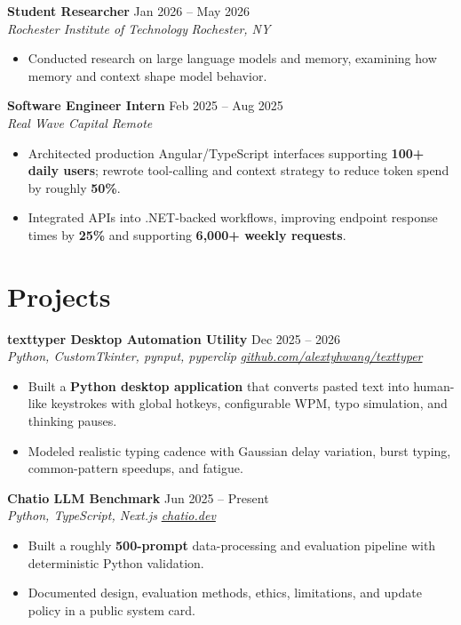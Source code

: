 \documentclass[10pt,letterpaper]{article}
\newif\ifresumeFirstRole
\newcommand{\resumeRole}[4]{%
  \ifresumeFirstRole
    \global\resumeFirstRolefalse
  \else
    \vspace{0pt plus 1fill}%
  \fi
  \textbf{#1} \hfill #2\\
  \textit{#3} \hfill \textit{#4}
}
\begin{document}
\resumeRole{Student Researcher}{Jan 2026 -- May 2026}{Rochester Institute of Technology}{Rochester, NY}
\begin{itemize}
  \item Conducted research on large language models and memory, examining how memory and context shape model behavior.
\end{itemize}

\resumeRole{Software Engineer Intern}{Feb 2025 -- Aug 2025}{Real Wave Capital}{Remote}
\begin{itemize}
  \item Architected production Angular/TypeScript interfaces supporting \textbf{100+ daily users}; rewrote tool-calling and context strategy to reduce token spend by roughly \textbf{50\%}.
  \item Integrated APIs into .NET-backed workflows, improving endpoint response times by \textbf{25\%} and supporting \textbf{6,000+ weekly requests}.
\end{itemize}

\section*{Projects}
\resumeRole{texttyper Desktop Automation Utility}{Dec 2025 -- 2026}{Python, CustomTkinter, pynput, pyperclip}{\href{https://github.com/alextyhwang/texttyper}{github.com/alextyhwang/texttyper}}
\begin{itemize}
  \item Built a \textbf{Python desktop application} that converts pasted text into human-like keystrokes with global hotkeys, configurable WPM, typo simulation, and thinking pauses.
  \item Modeled realistic typing cadence with Gaussian delay variation, burst typing, common-pattern speedups, and fatigue.
\end{itemize}

\resumeRole{Chatio LLM Benchmark}{Jun 2025 -- Present}{Python, TypeScript, Next.js}{\href{https://chatio.dev}{chatio.dev}}
\begin{itemize}
  \item Built a roughly \textbf{500-prompt} data-processing and evaluation pipeline with deterministic Python validation.
  \item Documented design, evaluation methods, ethics, limitations, and update policy in a public system card.
\end{itemize}
\end{document}
